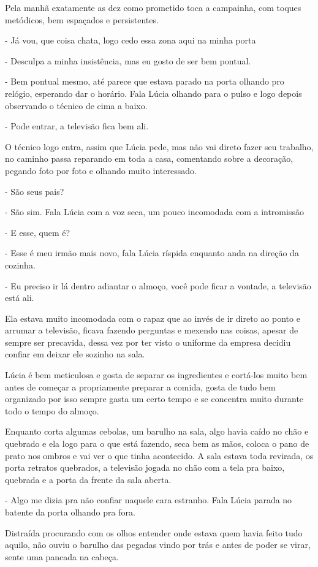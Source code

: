 Pela manhã exatamente as dez como prometido toca a campainha, com toques metódicos, bem espaçados e persistentes.

- Já vou, que coisa chata, logo cedo essa zona aqui na minha porta

- Desculpa a minha insistência, mas eu gosto de ser bem pontual.

- Bem pontual mesmo, até parece que estava parado na porta olhando pro relógio, esperando dar o horário. Fala Lúcia olhando para o pulso e logo depois observando o técnico de cima a baixo.

- Pode entrar, a televisão fica bem ali.

O técnico logo entra, assim que Lúcia pede, mas não vai direto fazer seu trabalho, no caminho passa reparando em toda a casa, comentando sobre a decoração, pegando foto por foto e olhando muito interessado.

- São seus pais?

- São sim. Fala Lúcia com a voz seca, um pouco incomodada com a intromissão

- E esse, quem é?

- Esse é meu irmão mais novo, fala Lúcia ríspida enquanto anda na direção da cozinha.

- Eu preciso ir lá dentro adiantar o almoço, você pode ficar a vontade, a televisão está ali.

Ela estava muito incomodada com o rapaz que ao invés de ir direto ao ponto e arrumar a televisão, ficava fazendo perguntas e mexendo nas coisas, apesar de sempre ser precavida, dessa vez por ter visto o uniforme da empresa decidiu confiar em deixar ele sozinho na sala. 

Lúcia é bem meticulosa e gosta de separar os ingredientes e cortá-los muito bem antes de começar a propriamente preparar a comida, gosta de tudo bem organizado por isso sempre gasta um certo tempo e se concentra muito durante todo o tempo do almoço.

Enquanto corta algumas cebolas, um barulho na sala, algo havia caído no chão e quebrado e ela logo para o que está fazendo, seca bem as mãos, coloca o pano de prato nos ombros e vai ver o que tinha acontecido. A sala estava toda revirada, os porta retratos quebrados, a televisão jogada no chão com a tela pra baixo, quebrada e a porta da frente da sala aberta.

- Algo me dizia pra não confiar naquele cara estranho. Fala Lúcia parada no batente da porta olhando pra fora.

Distraída procurando com os olhos entender onde estava quem havia feito tudo aquilo, não ouviu o barulho das pegadas vindo por trás e antes de poder se virar, sente uma pancada na cabeça.

